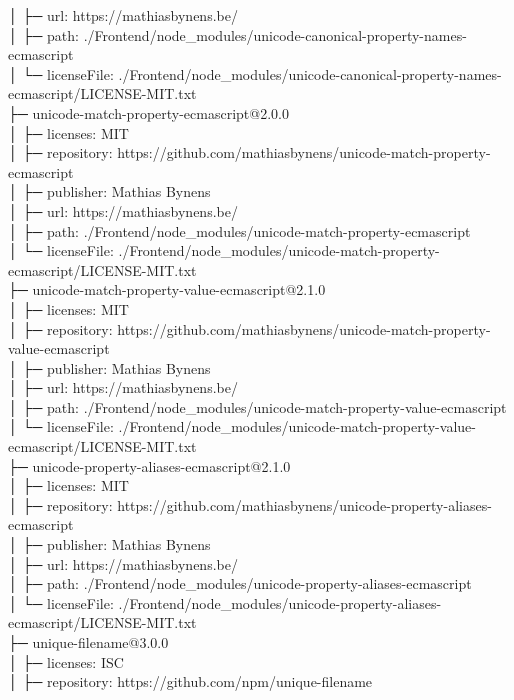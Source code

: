 │  ├─ url: https://mathiasbynens.be/\\
│  ├─ path: ./Frontend/node\_modules/unicode-canonical-property-names-ecmascript\\
│  └─ licenseFile: ./Frontend/node\_modules/unicode-canonical-property-names-ecmascript/LICENSE-MIT.txt\\
├─ unicode-match-property-ecmascript@2.0.0\\
│  ├─ licenses: MIT\\
│  ├─ repository: https://github.com/mathiasbynens/unicode-match-property-ecmascript\\
│  ├─ publisher: Mathias Bynens\\
│  ├─ url: https://mathiasbynens.be/\\
│  ├─ path: ./Frontend/node\_modules/unicode-match-property-ecmascript\\
│  └─ licenseFile: ./Frontend/node\_modules/unicode-match-property-ecmascript/LICENSE-MIT.txt\\
├─ unicode-match-property-value-ecmascript@2.1.0\\
│  ├─ licenses: MIT\\
│  ├─ repository: https://github.com/mathiasbynens/unicode-match-property-value-ecmascript\\
│  ├─ publisher: Mathias Bynens\\
│  ├─ url: https://mathiasbynens.be/\\
│  ├─ path: ./Frontend/node\_modules/unicode-match-property-value-ecmascript\\
│  └─ licenseFile: ./Frontend/node\_modules/unicode-match-property-value-ecmascript/LICENSE-MIT.txt\\
├─ unicode-property-aliases-ecmascript@2.1.0\\
│  ├─ licenses: MIT\\
│  ├─ repository: https://github.com/mathiasbynens/unicode-property-aliases-ecmascript\\
│  ├─ publisher: Mathias Bynens\\
│  ├─ url: https://mathiasbynens.be/\\
│  ├─ path: ./Frontend/node\_modules/unicode-property-aliases-ecmascript\\
│  └─ licenseFile: ./Frontend/node\_modules/unicode-property-aliases-ecmascript/LICENSE-MIT.txt\\
├─ unique-filename@3.0.0\\
│  ├─ licenses: ISC\\
│  ├─ repository: https://github.com/npm/unique-filename\\
